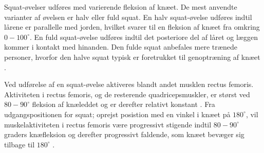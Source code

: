 Squat-øvelser udføres med varierende fleksion af knæet. De mest anvendte varianter af øvelsen er halv eller fuld squat. En halv squat-øvelse udføres indtil lårene er parallelle med jorden, hvilket svarer til en fleksion af knæet fra omkring $0-100^{\circ}$. En fuld squat-øvelse udføres indtil det posteriore del af låret og læggen kommer i kontakt med hinanden. Den fulde squat anbefales mere trænede personer, hvorfor den halve squat typisk er foretrukket til genoptræning af knæet \citep{escamilla2001}.

Ved udførelse af en squat-øvelse aktiveres blandt andet musklen rectus femoris. Aktiviteten i rectus femoris, og de resterende quadricepsmuskler, er størst ved $80-90^{\circ}$ fleksion af knæleddet og er derefter relativt konstant \citep{schoenfeld2010}. Fra udgangspositionen for squat; oprejst posistion med en vinkel i knæet på $180^{\circ}$, vil muskelaktiviteten i rectus femoris være progressivt stigende indtil $80-90^{\circ}$ graders knæfleksion og derefter progressivt faldende, som knæet bevæger sig tilbage til $180^{\circ}$ \citep{escamilla}. 




